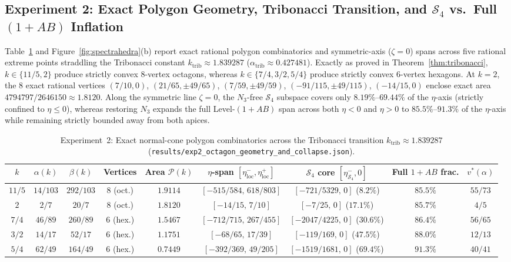 \documentclass[11pt,a4paper]{article}
\newcommand{\calP}{\mathcal{P}}
\newcommand{\calS}{\mathcal{S}}
\begin{document}
\subsection{Experiment 2: Exact Polygon Geometry, Tribonacci Transition, and \texorpdfstring{$\calS_4$}{S\_4} vs.\ Full \texorpdfstring{$(1+AB)$}{(1+AB)} Inflation}

Table~\ref{tab:polygons} and Figure~\ref{fig:spectrahedra}(b) report exact rational polygon combinatorics and symmetric-axis ($\zeta = 0$) spans across five rational extreme points straddling the Tribonacci constant $k_{\mathrm{trib}} \approx 1.839287$ ($\alpha_{\mathrm{trib}} \approx 0.427481$).
Exactly as proved in Theorem~\ref{thm:tribonacci}, $k \in \{11/5, 2\}$ produce strictly convex 8-vertex octagons, whereas $k \in \{7/4, 3/2, 5/4\}$ produce strictly convex 6-vertex hexagons.
At $k = 2$, the 8 exact rational vertices $(7/10, 0)$, $(21/65, \pm 49/65)$, $(7/59, \pm 49/59)$, $(-91/115, \pm 49/115)$, $(-14/15, 0)$ enclose exact area $4794797/2646150 \approx 1.8120$.
Along the symmetric line $\zeta = 0$, the $N_3$-free $\calS_4$ subspace covers only $8.19\%$--$69.44\%$ of the $\eta$-axis (strictly confined to $\eta \le 0$), whereas restoring $N_3$ expands the full Level-$(1+AB)$ span across both $\eta < 0$ and $\eta > 0$ to $85.5\%$--$91.3\%$ of the $\eta$-axis while remaining strictly bounded away from both apices.

\begin{table}[t]
\centering
\caption{Experiment~2: Exact normal-cone polygon combinatorics across the Tribonacci transition $k_{\mathrm{trib}} \approx 1.839287$ (\texttt{results/exp2\_octagon\_geometry\_and\_collapse.json}).}
\label{tab:polygons}
\scriptsize
\setlength{\tabcolsep}{3.6pt}
\begin{tabular}{@{}ccccccccc@{}}
\toprule
$k$ & $\alpha(k)$ & $\beta(k)$ & Vertices & Area $\calP(k)$ & $\eta$-span $[\eta_{\mathrm{loc}}^-, \eta_{\mathrm{loc}}^+]$ & $\calS_4$ core $[\eta_{\calS_4}^-, 0]$ & Full $1+AB$ frac. & $v^*(\alpha)$ \\
\midrule
$11/5$ & $14/103$ & $292/103$ & $8$ (oct.) & $1.9114$ & $[-515/584,\, 618/803]$ & $[-721/5329,\, 0]$ ($8.2\%$) & $85.5\%$ & $55/73$ \\
$2$ & $2/7$ & $20/7$ & $8$ (oct.) & $1.8120$ & $[-14/15,\, 7/10]$ & $[-7/25,\, 0]$ ($17.1\%$) & $85.7\%$ & $4/5$ \\
$7/4$ & $46/89$ & $260/89$ & $6$ (hex.) & $1.5467$ & $[-712/715,\, 267/455]$ & $[-2047/4225,\, 0]$ ($30.6\%$) & $86.4\%$ & $56/65$ \\
$3/2$ & $14/17$ & $52/17$ & $6$ (hex.) & $1.1751$ & $[-68/65,\, 17/39]$ & $[-119/169,\, 0]$ ($47.5\%$) & $88.0\%$ & $12/13$ \\
$5/4$ & $62/49$ & $164/49$ & $6$ (hex.) & $0.7449$ & $[-392/369,\, 49/205]$ & $[-1519/1681,\, 0]$ ($69.4\%$) & $91.3\%$ & $40/41$ \\
\bottomrule
\end{tabular}
\end{table}
\end{document}
